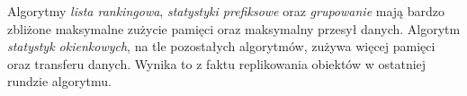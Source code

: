 \documentclass[licencjacka]{pracamgr}
\begin{document}
\begin{table}[H]
\centering
\caption{Podsumowanie algorytmu \textit{statystyk okienkowych} na Sparku.}
\label{tab:my-table}
\end{table}

Algorytmy \textit{lista rankingowa}, \textit{statystyki prefiksowe} oraz \textit{grupowanie} mają bardzo zbliżone maksymalne zużycie pamięci oraz maksymalny przesył danych. Algorytm \textit{statystyk okienkowych}, na tle pozostałych algorytmów, zużywa więcej pamięci oraz transferu danych. Wynika to z faktu replikowania obiektów w ostatniej rundzie algorytmu.
\end{document}
